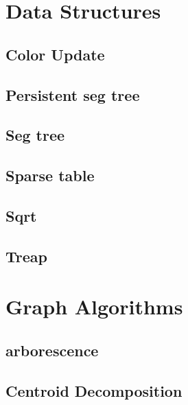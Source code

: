 \section{Data Structures}
\subsection{Color Update}
\raggedbottom
\hrulefill
\subsection{Persistent seg tree}
\raggedbottom
\hrulefill
\subsection{Seg tree}
\raggedbottom
\hrulefill
\subsection{Sparse table}
\raggedbottom
\hrulefill
\subsection{Sqrt}
\raggedbottom
\hrulefill
\subsection{Treap}
\raggedbottom
\hrulefill

\section{Graph Algorithms}
\subsection{arborescence}
\raggedbottom
\hrulefill
\subsection{Centroid Decomposition}
\raggedbottom
\hrulefill

